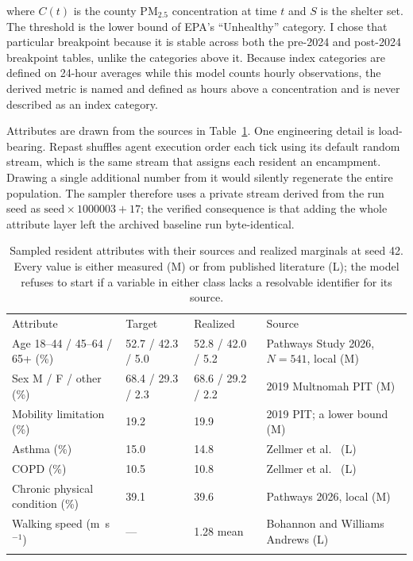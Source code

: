 \documentclass[graybox]{svmult}
\begin{document}
\noindent where $C(t)$ is the county PM$_{2.5}$ concentration at time $t$ and
$S$ is the shelter set. The threshold is the lower bound of EPA's ``Unhealthy''
category. I chose that particular breakpoint because it is stable across both
the pre-2024 and post-2024 breakpoint tables, unlike the categories above it.
Because index categories are defined on 24-hour averages while this model counts
hourly observations, the derived metric is named and defined as hours above a
concentration and is never described as an index category.

Attributes are drawn from the sources in Table~\ref{tab:params}. One engineering
detail is load-bearing. Repast shuffles agent execution order each tick using
its default random stream, which is the same stream that assigns each resident
an encampment. Drawing a single additional number from it would silently
regenerate the entire population. The sampler therefore uses a private stream
derived from the run seed as $\mathrm{seed} \times 1000003 + 17$; the verified
consequence is that adding the whole attribute layer left the archived baseline
run byte-identical.

\begin{table}
\caption{Sampled resident attributes with their sources and realized marginals
at seed 42. Every value is either measured (M) or from published literature (L);
the model refuses to start if a variable in either class lacks a resolvable
identifier for its source.}
\label{tab:params}
\begin{tabular}{p{3.0cm}p{1.9cm}p{1.5cm}p{3.5cm}}
\hline\noalign{\smallskip}
Attribute & Target & Realized & Source \\
\noalign{\smallskip}\svhline\noalign{\smallskip}
Age 18--44 / 45--64 / 65+ (\%) & 52.7 / 42.3 / 5.0 & 52.8 / 42.0 / 5.2 &
  Pathways Study 2026, $N=541$, local (M) \\
Sex M / F / other (\%) & 68.4 / 29.3 / 2.3 & 68.6 / 29.2 / 2.2 &
  2019 Multnomah PIT (M) \\
Mobility limitation (\%) & 19.2 & 19.9 & 2019 PIT; a lower bound (M) \\
Asthma (\%) & 15.0 & 14.8 & Zellmer et al.\ \cite{zellmer2025} (L) \\
COPD (\%) & 10.5 & 10.8 & Zellmer et al.\ \cite{zellmer2025} (L) \\
Chronic physical condition (\%) & 39.1 & 39.6 & Pathways 2026, local (M) \\
Walking speed (m~s$^{-1}$) & --- & 1.28 mean & Bohannon and Williams Andrews
  \cite{bohannon2011} (L) \\
\noalign{\smallskip}\hline\noalign{\smallskip}
\end{tabular}
\end{table}
\end{document}
